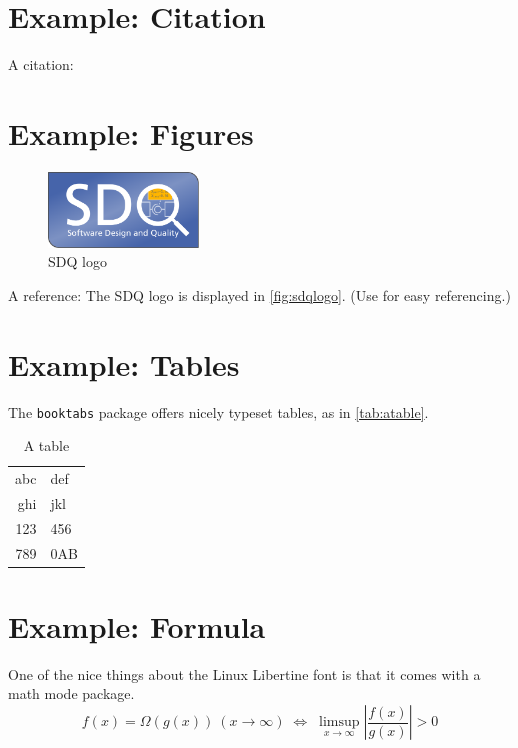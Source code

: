\section{Example: Citation}
A citation: \cite{becker2008a} 

\section{Example: Figures}
\label{sec:Introduction:Figures}
\begin{figure}
\centering
\includegraphics[width=4cm]{logos/sdqlogo}
\caption{SDQ logo}
\label{fig:sdqlogo}
\end{figure}

A reference: The SDQ logo is displayed in \autoref{fig:sdqlogo}. 
(Use  for easy referencing.) 

\section{Example: Tables}
The \texttt{booktabs} package offers nicely typeset tables, as in \autoref{tab:atable}.

\label{sec:Introduction:Tables}
\begin{table}
\centering
\begin{tabular}{r l}
\toprule
abc & def\\
ghi & jkl\\
\midrule
123 & 456\\
789 & 0AB\\
\bottomrule
\end{tabular}
\caption{A table}
\label{tab:atable}
\end{table}

\section{Example: Formula}
One of the nice things about the Linux Libertine font is that it comes with
a math mode package.
\begin{displaymath}
f(x)=\Omega(g(x))\ (x\rightarrow\infty)\;\Leftrightarrow\;
\limsup_{x \to \infty} \left|\frac{f(x)}{g(x)}\right|> 0
\end{displaymath}

